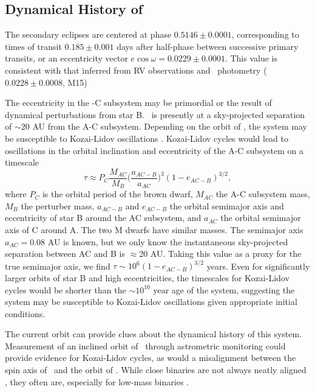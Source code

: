 \subsection{Dynamical History of \LHS}

The secondary eclipses are centered at phase $0.5146 \pm 0.0001$, corresponding
to times of transit $0.185 \pm 0.001$ days after half-phase between
successive primary transits, or an eccentricity vector 
$e \cos{\omega} = 0.0229 \pm 0.0001$.
This value is consistent with that inferred from RV observations and 
\itk\ photometry ($0.0228 \pm 0.0008$, M15)


The eccentricity in the \LA-C subsystem may be primordial or the result
of dynamical perturbations from star B. 
\LB\ is presently at a sky-projected separation of $\sim$20 AU from the A-C subsystem.
Depending on the orbit of \LB, the system may be susceptible to Kozai-Lidov oscillations
\citep{Kozai62, Lidov62}.
Kozai-Lidov cycles would lead to oscillations in the orbital inclination and eccentricity 
of the A-C subsystem on a timescale
\begin{equation}
\tau \approx P_C \frac{M_{AC}}{M_B} \bigg(\frac{a_{AC-B}}{a_{AC}}\bigg)^3 (1 - e_{AC-B})^{3/2},
\end{equation}
where $P_C$ is the orbital period of the brown dwarf, $M_{AC}$ the A-C subsystem mass,
$M_B$ the perturber mass, $a_{AC-B}$ and $e_{AC-B}$ the orbital semimajor axis and 
eccentricity of star B around the AC subsystem, and $a_{AC}$ the orbital semimajor axis
of C around A.
The two M dwarfs have similar masses. The semimajor axis $a_{AC} = 0.08$ AU is known,
but we only know the instantaneous sky-projected separation between AC and B is $\approx $20 AU.
Taking this value as a proxy for the true semimajor axis, we find
$\tau \sim 10^6 (1-e_{AC-B})^{3/2}$ years. Even for significantly larger orbits of star B and 
high eccentricities, the timescales for Kozai-Lidov cycles would be shorter
than the $\sim 10^{10}$ year age of the system, suggesting the system may be susceptible
to Kozai-Lidov oscillations given appropriate initial conditions.

The current orbit can provide clues about the dynamical history of this system. 
Measurement of an inclined orbit of \LB\ through astrometric 
monitoring could provide evidence for Kozai-Lidov cycles, as would a 
misalignment between the spin axis of \LA\ and the orbit of \LC.
While close binaries are not always neatly aligned \citep{Albrecht14},
they often are, especially for low-mass binaries \citep{Harding13, Triaud13}.









